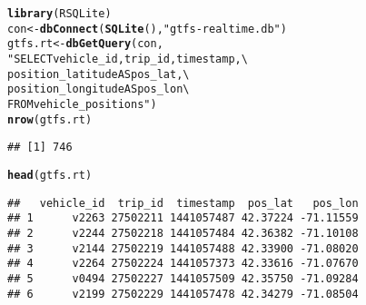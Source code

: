 \documentclass[10pt]{article}\usepackage[]{graphicx}\usepackage[]{color}
\makeatletter
\newcommand{\hlstr}[1]{\textcolor[rgb]{0.192,0.494,0.8}{#1}}%
\newcommand{\hlstd}[1]{\textcolor[rgb]{0.345,0.345,0.345}{#1}}%
\newcommand{\hlkwb}[1]{\textcolor[rgb]{0.69,0.353,0.396}{#1}}%
\newcommand{\hlkwd}[1]{\textcolor[rgb]{0.737,0.353,0.396}{\textbf{#1}}}%
\newenvironment{kframe}{%
 \def\at@end@of@kframe{}%
 \ifinner\ifhmode%
  \def\at@end@of@kframe{\end{minipage}}%
  \begin{minipage}{\columnwidth}%
 \fi\fi%
 \def\FrameCommand##1{\hskip\@totalleftmargin \hskip-\fboxsep
 \colorbox{shadecolor}{##1}\hskip-\fboxsep
     \hskip-\linewidth \hskip-\@totalleftmargin \hskip\columnwidth}%
 \MakeFramed {\advance\hsize-\width
   \@totalleftmargin\z@ \linewidth\hsize
   \@setminipage}}%
 {\par\unskip\endMakeFramed%
 \at@end@of@kframe}
\newenvironment{knitrout}{}{} %
\makeatother
\begin{document}
\begin{knitrout}
\color{fgcolor}\begin{kframe}
\begin{alltt}
\hlkwd{library}\hlstd{(RSQLite)}
\hlstd{con} \hlkwb{<-} \hlkwd{dbConnect}\hlstd{(}\hlkwd{SQLite}\hlstd{(),} \hlstr{"gtfs-realtime.db"}\hlstd{)}
\hlstd{gtfs.rt} \hlkwb{<-} \hlkwd{dbGetQuery}\hlstd{(con,}
                      \hlstr{"SELECT vehicle_id, trip_id, timestamp, \textbackslash{}
                              position_latitude AS pos_lat, \textbackslash{}
                              position_longitude AS pos_lon \textbackslash{}
                       FROM vehicle_positions"}\hlstd{)}
\hlkwd{nrow}\hlstd{(gtfs.rt)}
\end{alltt}
\begin{verbatim}
## [1] 746
\end{verbatim}
\begin{alltt}
\hlkwd{head}\hlstd{(gtfs.rt)}
\end{alltt}
\begin{verbatim}
##   vehicle_id  trip_id  timestamp  pos_lat   pos_lon
## 1      v2263 27502211 1441057487 42.37224 -71.11559
## 2      v2244 27502218 1441057484 42.36382 -71.10108
## 3      v2144 27502219 1441057488 42.33900 -71.08020
## 4      v2264 27502224 1441057373 42.33616 -71.07670
## 5      v0494 27502227 1441057509 42.35750 -71.09284
## 6      v2199 27502229 1441057478 42.34279 -71.08504
\end{verbatim}
\end{kframe}
\end{knitrout}
\end{document}

